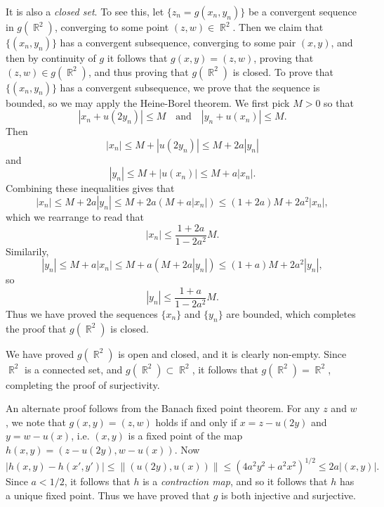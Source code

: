 \documentclass[answers]{exam}
\DeclareMathOperator{\RR}{\mathbb{R}}
\begin{document}
\begin{questions}
\begin{solution}
	It is also a \emph{closed set}. To see this, let $\{ z_n = g(x_n,y_n) \}$ be a convergent sequence in $g(\RR^2)$, converging to some point $(z,w) \in \RR^2$. Then we claim that $\{ (x_n,y_n) \}$ has a convergent subsequence, converging to some pair $(x,y)$, and then by continuity of $g$ it follows that $g(x,y) = (z,w)$, proving that $(z,w) \in g(\RR^2)$, and thus proving that $g(\RR^2)$ is closed. To prove that $\{ (x_n,y_n) \}$ has a convergent subsequence, we prove that the sequence is bounded, so we may apply the Heine-Borel theorem. We first pick $M > 0$ so that
	\[ |x_n + u(2y_n)| \leq M \quad\text{and}\quad |y_n + u(x_n)| \leq M. \]
	Then
	\[ |x_n| \leq M + |u(2y_n)| \leq M + 2a |y_n| \]
	and
	\[ |y_n| \leq M + |u(x_n)| \leq M + a |x_n|. \]
	Combining these inequalities gives that
	\[ |x_n| \leq M + 2 a | y_n| \leq M + 2a ( M + a |x_n| ) \leq (1 + 2a) M + 2a^2 |x_n|, \]
	which we rearrange to read that
	\[ |x_n| \leq \frac{1 + 2a}{1 - 2a^2} M. \]
	Similarily,
	\[ |y_n| \leq M + a |x_n| \leq M + a ( M + 2 a |y_n| ) \leq (1 + a) M + 2a^2 |y_n|, \]
	so
	\[ |y_n| \leq \frac{1 + a}{1 - 2a^2} M. \]
	Thus we have proved the sequences $\{ x_n \}$ and $\{ y_n \}$ are bounded, which completes the proof that $g(\RR^2)$ is closed.

	We have proved $g(\RR^2)$ is open and closed, and it is clearly non-empty. Since $\RR^2$ is a connected set, and $g(\RR^2) \subset \RR^2$, it follows that $g(\RR^2) = \RR^2$, completing the proof of surjectivity.

	An alternate proof follows from the Banach fixed point theorem. For any $z$ and $w$, we note that $g(x,y) = (z,w)$ holds if and only if $x = z - u(2y)$ and $y = w - u(x)$, i.e. $(x,y)$ is a fixed point of the map $h(x,y) = (z - u(2y), w - u(x))$. Now
	\[ |h(x,y) - h(x',y')| \leq \| ( u(2y), u(x) ) \| \leq ( 4 a^2 y^2 + a^2 x^2 )^{1/2} \leq 2a |(x,y)|. \]
	Since $a < 1/2$, it follows that $h$ is a \emph{contraction map}, and so it follows that $h$ has a unique fixed point. Thus we have proved that $g$ is both injective and surjective.


\end{solution}
\end{questions}
\end{document}

